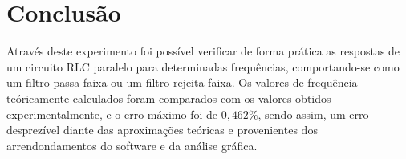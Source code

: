 \newpage
\section{Conclusão}

Através deste experimento foi possível verificar de forma prática as respostas de um circuito RLC paralelo para determinadas frequências, comportando-se como um filtro passa-faixa ou um filtro rejeita-faixa. Os valores de frequência teóricamente calculados foram comparados com os valores obtidos experimentalmente, e o erro máximo foi de $0,462\%$, sendo assim, um erro desprezível diante das aproximações teóricas e provenientes dos arrendondamentos do software e da análise gráfica. 

\pagebreak